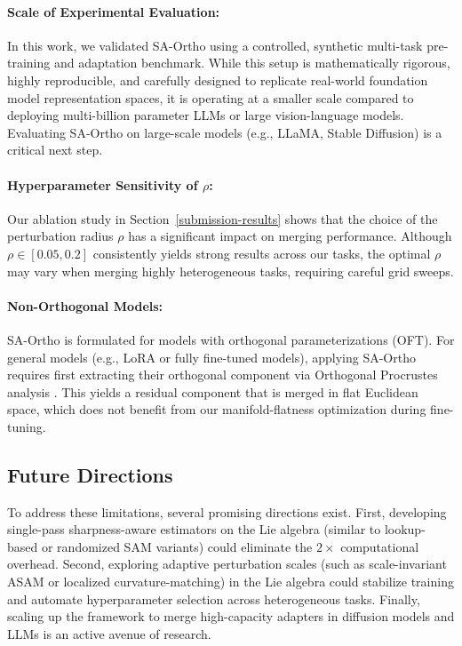 \documentclass{article}
\theoremstyle{plain}
\theoremstyle{definition}
\theoremstyle{remark}
\begin{document}
\paragraph{Scale of Experimental Evaluation:} In this work, we validated SA-Ortho using a controlled, synthetic multi-task pre-training and adaptation benchmark. While this setup is mathematically rigorous, highly reproducible, and carefully designed to replicate real-world foundation model representation spaces, it is operating at a smaller scale compared to deploying multi-billion parameter LLMs or large vision-language models. Evaluating SA-Ortho on large-scale models (e.g., LLaMA, Stable Diffusion) is a critical next step.

\paragraph{Hyperparameter Sensitivity of $\rho$:} Our ablation study in Section~\ref{submission-results} shows that the choice of the perturbation radius $\rho$ has a significant impact on merging performance. Although $\rho \in [0.05, 0.2]$ consistently yields strong results across our tasks, the optimal $\rho$ may vary when merging highly heterogeneous tasks, requiring careful grid sweeps.

\paragraph{Non-Orthogonal Models:} SA-Ortho is formulated for models with orthogonal parameterizations (OFT). For general models (e.g., LoRA or fully fine-tuned models), applying SA-Ortho requires first extracting their orthogonal component via Orthogonal Procrustes analysis \cite{yang2026orthomerge}. This yields a residual component that is merged in flat Euclidean space, which does not benefit from our manifold-flatness optimization during fine-tuning.

\subsection{Future Directions}
To address these limitations, several promising directions exist. First, developing single-pass sharpness-aware estimators on the Lie algebra (similar to lookup-based or randomized SAM variants) could eliminate the $2\times$ computational overhead. Second, exploring adaptive perturbation scales (such as scale-invariant ASAM \cite{kwon2021asam} or localized curvature-matching) in the Lie algebra could stabilize training and automate hyperparameter selection across heterogeneous tasks. Finally, scaling up the framework to merge high-capacity adapters in diffusion models and LLMs is an active avenue of research.
\end{document}
